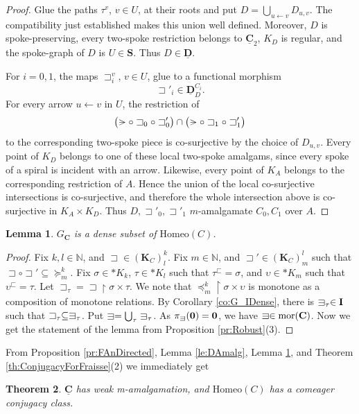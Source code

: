\documentclass[12pt]{amsart}
\numberwithin{equation}{section}
\theoremstyle{plain}
\newtheorem{theorem}{Theorem}[section]
\newtheorem{lemma}[theorem]{Lemma}
\theoremstyle{definition}
\newcommand{\nil}{\mathrel{\vphantom{>}\text{\mathsurround=0pt\ooalign{$>$\cr$-$\cr}}}}
\newcommand{\sqni}{\mathrel{\vphantom{\sqsupset}\text{\mathsurround=0pt\ooalign{$\sqsupset$\cr$-$\cr}}}}
\newcommand \Homeo{ \mbox{Homeo}}
\newcommand \sqsp{\sqsupset}
\newcommand \sqsb{\sqsubset}
\newcommand \la{\leftarrow}
\newcommand \mor{{\rm{mor}}}
\newcommand \rt{\mathbf{0}}
\newcommand \uhr{\upharpoonright}
\newcommand \CCb{\mathbf{C}}
\newcommand \IIb{\mathbf{I}}
\newcommand \KKb{\mathbf{K}}
\newcommand \SSb{\mathbf{S}}
\newcommand \CCub{\underline{\mathbf{C}}}
\newcommand \DDub{\underline{\mathbf{D}}}
\newcommand \NN{\mathbb{N}}
\begin{document}
\begin{proof}
	Glue the paths $\tau^v$, $v\in U$, at their roots and put $D=\bigcup_{u\la v}D_{u,v}$.
	The compatibility just established makes this union well defined.
	Moreover, $D$ is spoke-preserving, every two-spoke restriction belongs
	to $\CCub_2$, $K_D$ is regular, and the spoke-graph of $D$ is
	$U\in\SSb$. Thus $D\in\DDub$.
	
	For $i=0,1$, the maps $\sqsp_i^v$, $v\in U$, glue to a functional
	morphism
	\[
	\sqsp'_i\in\DDub^{C_i}_D.
	\]
	For every arrow $u\la v$ in $U$, the restriction of
	\[
	\bigl(\nil\circ\sqsp_0\circ\sqsp'_0\bigr)
	\cap
	\bigl(\nil\circ\sqsp_1\circ\sqsp'_1\bigr)
	\]
	to the corresponding two-spoke piece is co-surjective by the choice
	of $D_{u,v}$. Every point of $K_D$ belongs to one of these local
	two-spoke amalgams, since every spoke of a spiral is incident with an
	arrow. Likewise, every point of $K_A$ belongs to the corresponding
	restriction of $A$. Hence the union of the local co-surjective
	intersections is co-surjective, and therefore the whole intersection
	above is co-surjective in $K_A\times K_D$. Thus
	$D,\sqsp'_0,\sqsp'_1$ $m$-amalgamate $C_0,C_1$ over $A$.
\end{proof}

\begin{lemma}
\label{le:C_IDense}
$G_\CCb$ is a dense subset of $\Homeo(C)$.
\end{lemma}

\begin{proof}
Fix  $k,l \in \NN$, and $\sqsp \in (\KKb_C)^k_l$. Fix  $m \in \NN$, and $\sqsp' \in (\KKb_C)^l_m$ such that $\sqsp \circ \sqsp' \subseteq \succeq^k_m$. Fix $\sigma \in *K_k$, $\tau \in *K_l$ such that $\tau^\sqsb=\sigma$, and $\upsilon \in *K_m$ such that $\upsilon^\sqsb=\tau$. Let $\sqsp_\tau=\sqsp \uhr \sigma \times \tau$. We note that $\preceq^k_m \uhr \sigma \times \upsilon$ is monotone as a composition of monotone relations. By Corollary \ref{co:G_IDense}, there is $\sqni_\tau \in \IIb$ such that $\sqsp_\tau \subseteq \sqni_\tau$. Put $\sqni=\bigcup_\tau \sqni_\tau$. As $ \pi_{\sqni} (\rt)=\rt$, we have $\sqni \in \mor(\CCb)$. Now we get the statement of the lemma from Proposition \ref{pr:Robust}(3).   
\end{proof}

From Proposition \ref{pr:FAnDirected}, Lemma \ref{le:DAmalg}, Lemma \ref{le:C_IDense}, and Theorem \ref{th:ConjugacyForFraisse}(2) we immediately get
%
\begin{theorem}
	$\CCub$  has weak m-amalgamation, and $\Homeo(C)$ has a comeager conjugacy class.
\end{theorem}
\end{document}
